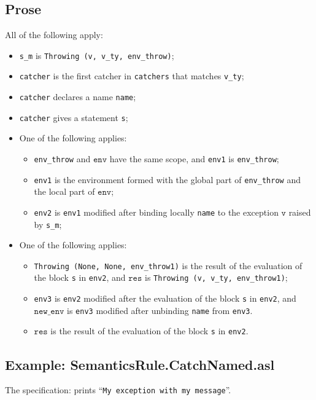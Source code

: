 \documentclass{book}
\newcommand\newenv[0]{\texttt{new\_env}}
\newcommand\env[0]{\texttt{env}}
\newcommand\vv[0]{\texttt{v}}
\newcommand\vres[0]{\texttt{res}}
\begin{document}
    \subsection{Prose}
    All of the following apply:
    \begin{itemize}
    \item \texttt{s\_m} is \texttt{Throwing (v, v\_ty, env\_throw)};
    \item \texttt{catcher} is the first catcher in \texttt{catchers} that matches \texttt{v\_ty};
    \item \texttt{catcher} declares a name \texttt{name};
    \item \texttt{catcher} gives a statement \texttt{s};
    \item One of the following applies:
      \begin{itemize}
      \item \texttt{env\_throw} and $\env$ have the same scope, and \texttt{env1} is \texttt{env\_throw};
      \item \texttt{env1} is the environment formed with the global part of \texttt{env\_throw}
        and the local part of $\env$;
      \item \texttt{env2} is \texttt{env1} modified after binding locally \texttt{name} to the exception
        $\vv$ raised by \texttt{s\_m};
      \end{itemize}
    \item One of the following applies:
      \begin{itemize}
      \item \texttt{Throwing (None, None, env\_throw1)} is the result of the evaluation of
        the block \texttt{s} in \texttt{env2}, and $\vres$ is \texttt{Throwing (v, v\_ty, env\_throw1)};
      \item \texttt{env3} is \texttt{env2} modified after the evaluation of the block \texttt{s} in
        \texttt{env2}, and $\newenv$ is \texttt{env3} modified after unbinding \texttt{name} from
        \texttt{env3}.
      \item $\vres$ is the result of the evaluation of the block \texttt{s} in \texttt{env2}.
      \end{itemize}
    \end{itemize}

    \subsection{Example: SemanticsRule.CatchNamed.asl}
    The specification:
    prints ``\texttt{My exception with my message}''.
\end{document}

